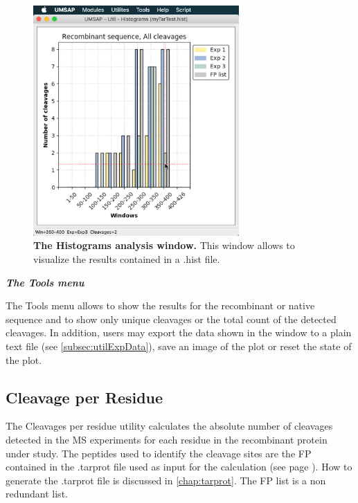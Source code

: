 \begin{figure}[h]
	\centering
	\includegraphics[width=0.7\textwidth]{./IMAGES/UTIL-HIST-WINDOW/util-histo-res.jpg}	    
	\caption[The Histograms analysis window]{\textbf{The Histograms analysis window.} This window allows to visualize the results contained in a .hist file.} 
	\label{fig:utilHistoCutShow}
	\vspace{-5pt} 	
\end{figure}

\textit{\textbf{The Tools menu}}

The Tools menu allows to show the results for the recombinant or native sequence and to show only unique cleavages or the total count of the detected cleavages. In addition, users may export the data shown in the window to a plain text file (see \autoref{subsec:utilExpData}), save an image of the plot or reset the state of the plot.

\subsection{Cleavage per Residue}
\label{subsec:utilCutsPerRes}
The Cleavages per residue utility calculates the absolute number of cleavages detected in the MS experiments for each residue in the recombinant protein under study. The peptides used to identify the cleavage sites are the FP contained in the .tarprot file used as input for the calculation (see page \pageref{par:tarprotPIP}). How to generate the .tarprot file is discussed in \autoref{chap:tarprot}. The FP list is a non redundant list.

